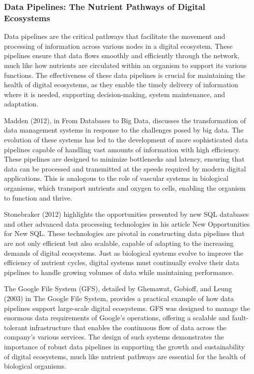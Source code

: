 \documentclass[12pt,twoside]{article}
\begin{document}
\subsubsection{Data Pipelines: The Nutrient Pathways of Digital Ecosystems}

Data pipelines are the critical pathways that facilitate the movement and processing of information across various nodes in a digital ecosystem. These pipelines ensure that data flows smoothly and efficiently through the network, much like how nutrients are circulated within an organism to support its various functions. The effectiveness of these data pipelines is crucial for maintaining the health of digital ecosystems, as they enable the timely delivery of information where it is needed, supporting decision-making, system maintenance, and adaptation.

Madden (2012), in From Databases to Big Data, discusses the transformation of data management systems in response to the challenges posed by big data. The evolution of these systems has led to the development of more sophisticated data pipelines capable of handling vast amounts of information with high efficiency. These pipelines are designed to minimize bottlenecks and latency, ensuring that data can be processed and transmitted at the speeds required by modern digital applications. This is analogous to the role of vascular systems in biological organisms, which transport nutrients and oxygen to cells, enabling the organism to function and thrive.

Stonebraker (2012) highlights the opportunities presented by new SQL databases and other advanced data processing technologies in his article New Opportunities for New SQL. These technologies are pivotal in constructing data pipelines that are not only efficient but also scalable, capable of adapting to the increasing demands of digital ecosystems. Just as biological systems evolve to improve the efficiency of nutrient cycles, digital systems must continually evolve their data pipelines to handle growing volumes of data while maintaining performance.

The Google File System (GFS), detailed by Ghemawat, Gobioff, and Leung (2003) in The Google File System, provides a practical example of how data pipelines support large-scale digital ecosystems. GFS was designed to manage the enormous data requirements of Google’s operations, offering a scalable and fault-tolerant infrastructure that enables the continuous flow of data across the company’s various services. The design of such systems demonstrates the importance of robust data pipelines in supporting the growth and sustainability of digital ecosystems, much like nutrient pathways are essential for the health of biological organisms.
\end{document}
